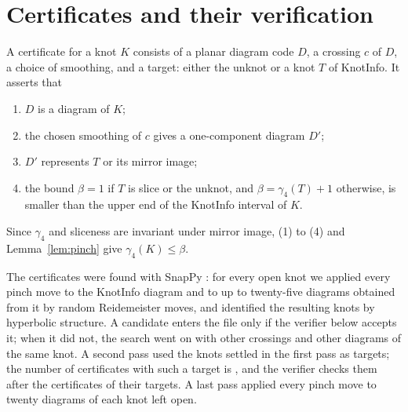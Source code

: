 \documentclass[11pt]{amsart}
\theoremstyle{definition}
\theoremstyle{remark}
\begin{document}
\section{Certificates and their verification}\label{sec:cert}

A certificate for a knot $K$ consists of a planar diagram code $D$, a crossing $c$ of $D$, a
choice of smoothing, and a target: either the unknot or a knot $T$ of KnotInfo. It asserts
that
\begin{enumerate}
\item $D$ is a diagram of $K$;
\item the chosen smoothing of $c$ gives a one-component diagram $D'$;
\item $D'$ represents $T$ or its mirror image;
\item the bound $\beta=1$ if $T$ is slice or the unknot, and $\beta=\gamma_4(T)+1$ otherwise,
is smaller than the upper end of the KnotInfo interval of $K$.
\end{enumerate}
Since $\gamma_4$ and sliceness are invariant under mirror image, (1) to (4) and
Lemma~\ref{lem:pinch} give $\gamma_4(K)\le\beta$.

The certificates were found with SnapPy \cite{SnapPy}: for every open knot we applied
every pinch move to the KnotInfo diagram and to up to twenty-five diagrams obtained from it by
random Reidemeister moves, and identified the resulting knots by hyperbolic structure. A
candidate enters the file only if the verifier below accepts it; when it did not, the search
went on with other crossings and other diagrams of the same knot. A
second pass used the knots settled in the first pass as targets; the number of certificates
with such a target is \nchained{}, and the verifier checks them after the certificates of
their targets. A last pass applied every pinch move to twenty diagrams of each knot left open.
\end{document}
